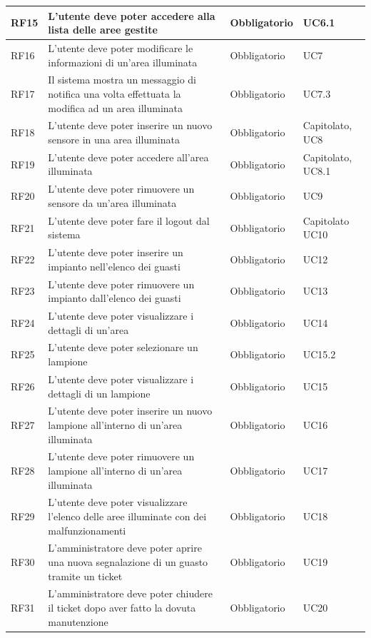 \documentclass[12pt]{article}
\begin{document}
\begin{xltabular}{\linewidth}{|>{\hsize}X|>{\hsize}X|>{\hsize}X|>{\hsize}X|}
\hline				
RF15	 & L'utente deve poter accedere alla lista delle aree gestite & Obbligatorio & UC6.1 \\
\hline				
RF16	 & L'utente deve poter modificare le informazioni di un'area illuminata & Obbligatorio & UC7 \\
\hline				
RF17	 & Il sistema mostra un messaggio di notifica una volta effettuata la modifica ad un area illuminata & Obbligatorio	& UC7.3 \\
\hline				
RF18	 & L'utente deve poter inserire un nuovo sensore in una area illuminata & Obbligatorio & Capitolato, UC8 \\
\hline				
RF19	 & L'utente deve poter accedere all'area illuminata & Obbligatorio & Capitolato, UC8.1 \\
\hline 				
RF20	 & L'utente deve poter rimuovere un sensore da un'area illuminata & Obbligatorio & UC9 \\
\hline				
RF21	 & L'utente deve poter fare il logout dal sistema & Obbligatorio & Capitolato UC10 \\
\hline										
RF22	 & L'utente deve poter inserire un impianto nell'elenco dei guasti & Obbligatorio & UC12 \\
\hline				
RF23	 & L'utente deve poter rimuovere un impianto dall'elenco dei guasti & Obbligatorio & UC13 \\
\hline				
RF24	 & L'utente deve poter visualizzare i dettagli di un'area & Obbligatorio & UC14 \\
\hline				
RF25	 & L'utente deve poter selezionare un lampione & Obbligatorio & UC15.2\\
\hline				
RF26	 & L'utente deve poter visualizzare i dettagli di un lampione & Obbligatorio & UC15\\
\hline				
RF27	 & L'utente deve poter inserire un nuovo lampione all'interno di un'area illuminata & Obbligatorio & UC16 \\
\hline				
RF28	 & L'utente deve poter rimuovere un lampione all'interno di un'area illuminata & Obbligatorio & UC17 \\
\hline				
RF29	 & L'utente deve poter visualizzare l'elenco delle aree illuminate con dei malfunzionamenti & Obbligatorio & UC18 \\
\hline				
RF30	 & L'amministratore deve poter aprire una nuova segnalazione di un guasto tramite un ticket & Obbligatorio & UC19 \\
\hline				
RF31	 & L'amministratore deve poter chiudere il ticket dopo aver fatto la dovuta manutenzione & Obbligatorio & UC20 \\

\end{xltabular}
\end{document}
